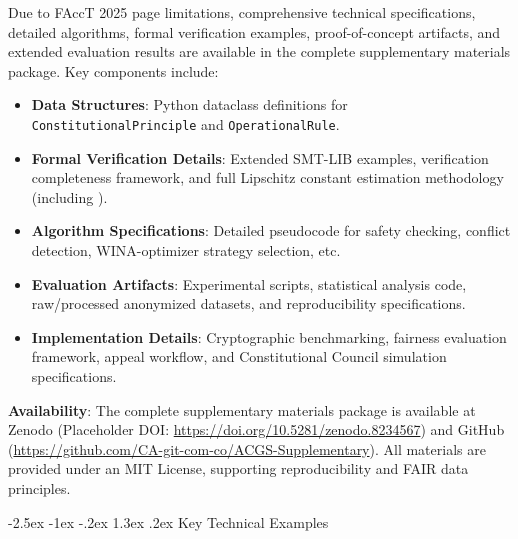 \documentclass[manuscript,screen,review,anonymous,9pt]{acmart}
\makeatletter
\renewcommand\section{\@startsection{section}{1}{\z@}%
  {-2.5ex \@plus -1ex \@minus -.2ex}%
  {1.3ex \@plus.2ex}%
  {\normalfont\Large\bfseries}}
\makeatother
\begin{document}
Due to FAccT 2025 page limitations, comprehensive technical specifications, detailed algorithms, formal verification examples, proof-of-concept artifacts, and extended evaluation results are available in the complete supplementary materials package. Key components include:
\begin{itemize}[leftmargin=*,itemsep=1pt,parsep=1pt]
    \item \textbf{Data Structures}: Python dataclass definitions for \texttt{ConstitutionalPrinciple} and \texttt{OperationalRule}.
    \item \textbf{Formal Verification Details}: Extended SMT-LIB examples, verification completeness framework, and full Lipschitz constant estimation methodology (including ).
    \item \textbf{Algorithm Specifications}: Detailed pseudocode for safety checking, conflict detection, WINA-optimizer strategy selection, etc.
    \item \textbf{Evaluation Artifacts}: Experimental scripts, statistical analysis code, raw/processed anonymized datasets, and reproducibility specifications.
    \item \textbf{Implementation Details}: Cryptographic benchmarking, fairness evaluation framework, appeal workflow, and Constitutional Council simulation specifications.
\end{itemize}
\textbf{Availability}: The complete supplementary materials package is available at Zenodo (Placeholder DOI: \url{https://doi.org/10.5281/zenodo.8234567}) and GitHub (\url{https://github.com/CA-git-com-co/ACGS-Supplementary}). All materials are provided under an MIT License, supporting reproducibility and FAIR data principles.

\section{Key Technical Examples}
\label{app:key_examples}
\end{document}
